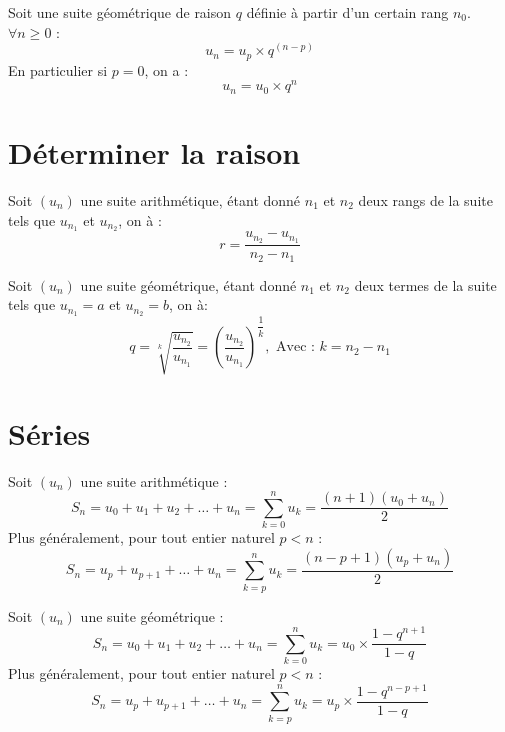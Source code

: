 \documentclass[11pt]{article}
\begin{document}
\begin{multicols}{2}
\begin{theoreme}
Soit une suite géométrique de raison $q$ définie à partir d'un
certain rang $n_0$.\\
$\forall n \ge 0$ :
\[ u_n = u_{p} \times q^{(n-p)}\]
En particulier si $p=0$, on a : 
\[ u_n = u_0 \times q^n\]
\end{theoreme}

\newcolumn

\section{Déterminer la raison}

\begin{propriete}
Soit $(u_n)$ une suite arithmétique, étant donné $n_1$ et $n_2$ deux
rangs de la suite tels que $u_{n_1}$ et $u_{n_2}$, on  à :
\[ r = \dfrac{u_{n_2}-u_{n_1}}{n_2-n_1}\]
\end{propriete}

\begin{propriete}
Soit $(u_n)$ une suite géométrique, étant donné $n_1$ et $n_2$ deux
termes de la suite tels que $u_{n_1}=a$ et $u_{n_2}=b$, on  à:
\[ q = \sqrt[k]{\dfrac{u_{n_2}}{u_{n_1}}} = \left(
 \dfrac{u_{n_2}}{u_{n_1}} \right)^{\dfrac{1}{k}}, \text{ Avec : }
k = n_{2}-n_{1}\]
\end{propriete}

\section{Séries}

\begin{theoreme}
Soit $(u_n)$ une suite arithmétique :
\[ S_n = u_0 + u_1 + u_2 + \ldots + u_n = \sum_{k=0}^{n} u_k = \dfrac{(n+1)(u_0+u_n)}{2} \]
Plus généralement, pour tout entier naturel $p<n$ :
\[S_n = u_p + u_{p+1} + \ldots + u_n = \sum_{k=p}^{n} u_k = \dfrac{(n-p+1)(u_p+u_n)}{2} \]
\end{theoreme}

\begin{theoreme}
Soit $(u_n)$ une suite géométrique :
\[ S_n = u_0 + u_1 + u_2 + \ldots + u_n = \sum_{k=0}^{n} u_k = u_0
\times \dfrac{1-q^{n+1}}{1-q} \]
Plus généralement, pour tout entier naturel $p<n$ :
\[ S_n = u_p + u_{p+1} + \ldots + u_n = \sum_{k=p}^{n} u_k = u_p
\times \dfrac{1-q^{n-p+1}}{1-q} \]
\end{theoreme}
\end{multicols}
\end{document}
